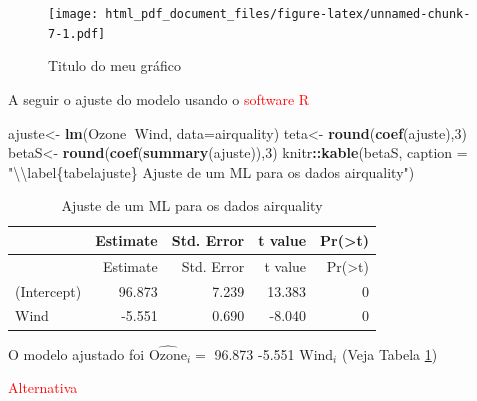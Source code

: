 \documentclass[12pt,brazil,]{article}
\newenvironment{Shaded}{\begin{snugshade}}{\end{snugshade}}
\newcommand{\CharTok}[1]{\textcolor[rgb]{0.31,0.60,0.02}{#1}}
\newcommand{\DataTypeTok}[1]{\textcolor[rgb]{0.13,0.29,0.53}{#1}}
\newcommand{\DecValTok}[1]{\textcolor[rgb]{0.00,0.00,0.81}{#1}}
\newcommand{\KeywordTok}[1]{\textcolor[rgb]{0.13,0.29,0.53}{\textbf{#1}}}
\newcommand{\NormalTok}[1]{#1}
\newcommand{\OperatorTok}[1]{\textcolor[rgb]{0.81,0.36,0.00}{\textbf{#1}}}
\newcommand{\StringTok}[1]{\textcolor[rgb]{0.31,0.60,0.02}{#1}}
\begin{document}
\begin{figure}
\centering
\texttt{[image: html\_pdf\_document\_files/figure-latex/unnamed-chunk-7-1.pdf]}
\caption{\label{scatterplot}Titulo do meu gráfico}
\end{figure}

A seguir o ajuste do modelo usando o \textcolor{red}{software R}

\begin{Shaded}
\begin{Highlighting}[]
\NormalTok{ajuste<-}\StringTok{ }\KeywordTok{lm}\NormalTok{(Ozone}\OperatorTok{~}\NormalTok{Wind, }\DataTypeTok{data=}\NormalTok{airquality)}
\NormalTok{teta<-}\StringTok{ }\KeywordTok{round}\NormalTok{(}\KeywordTok{coef}\NormalTok{(ajuste),}\DecValTok{3}\NormalTok{)}
\NormalTok{betaS<-}\StringTok{ }\KeywordTok{round}\NormalTok{(}\KeywordTok{coef}\NormalTok{(}\KeywordTok{summary}\NormalTok{(ajuste)),}\DecValTok{3}\NormalTok{)}
\NormalTok{knitr}\OperatorTok{::}\KeywordTok{kable}\NormalTok{(betaS, }\DataTypeTok{caption =} \StringTok{"}\CharTok{\textbackslash{}\textbackslash{}}\StringTok{label\{tabelajuste\}}
\StringTok{             Ajuste de um ML para os dados airquality"}\NormalTok{)}
\end{Highlighting}
\end{Shaded}

\begin{longtable}[]{@{}lrrrr@{}}
\caption{\label{tabelajuste} Ajuste de um ML para os dados
airquality}\tabularnewline
\toprule
& Estimate & Std. Error & t value &
Pr(\textgreater{}\textbar{}t\textbar{})\tabularnewline
\midrule
\endfirsthead
\toprule
& Estimate & Std. Error & t value &
Pr(\textgreater{}\textbar{}t\textbar{})\tabularnewline
\midrule
\endhead
(Intercept) & 96.873 & 7.239 & 13.383 & 0\tabularnewline
Wind & -5.551 & 0.690 & -8.040 & 0\tabularnewline
\bottomrule
\end{longtable}

O modelo ajustado foi \(\widehat{\text{Ozone}}_i=\) 96.873 -5.551
\(\text{Wind}_i\) (Veja Tabela \ref{tabelajuste})

\textcolor{red}{Alternativa}

\begin{Shaded}
\end{Shaded}
\end{document}
